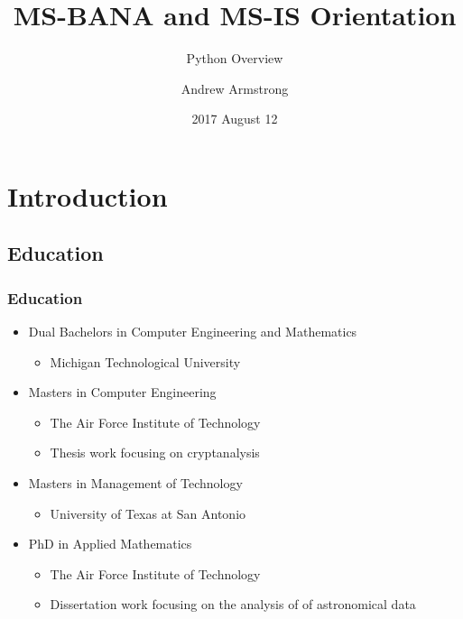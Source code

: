 \documentclass[mini frame in current subsection]{beamer}
\title{MS-BANA and MS-IS Orientation}
\subtitle{Python Overview}
\author{Andrew Armstrong}
\institute{University of Cincinnati\\ Carl H. Lindner College of Business}
\date{2017 August 12}
\begin{document}
\begin{frame}
  \titlepage
\end{frame}

\section{Introduction}

	\subsection{Education}

		\begin{frame}
			\frametitle{Education}
				\begin{itemize}
					\item  Dual Bachelors in Computer Engineering and Mathematics
						\begin{itemize}
							\item Michigan Technological University			
						\end{itemize}
					\item  Masters in Computer Engineering
						\begin{itemize}
							\item  The Air Force Institute of Technology
							\item  Thesis work focusing on cryptanalysis
						\end{itemize}
					\item  Masters in Management of Technology
						\begin{itemize}
							\item  University of Texas at San Antonio
						\end{itemize}
					\item  PhD in Applied Mathematics
						\begin{itemize}
							\item  The Air Force Institute of Technology
							\item  Dissertation work focusing on the analysis of of astronomical data
						\end{itemize}
				\end{itemize}
		\end{frame}
		
\end{document}
